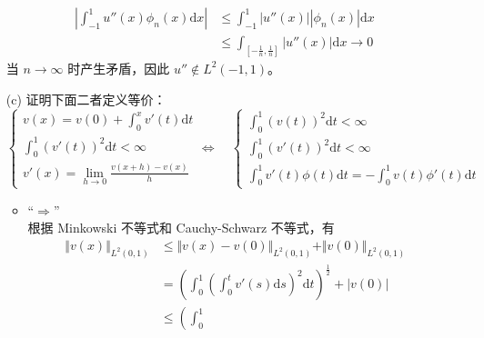 \documentclass[a4paper]{article}
\begin{document}
\begin{enumerate}
\begin{equation}
\begin{aligned}
                    \left|\int_{-1}^{1} u''(x) \phi_n(x) \text{d}x\right|
                    &\leq \int_{-1}^{1} |u''(x)||\phi_n(x)| \text{d}x\\
                    &\leq \int_{[-\frac{1}{n},\frac{1}{n}]} |u''(x)| \text{d}x
                    \to 0
                \end{aligned}
            \end{equation}
            当 $n \to \infty$ 时产生矛盾，因此 $u'' \notin L^2(-1,1)$。
    \item[(c)] 证明下面二者定义等价：
            \begin{equation}
                \begin{cases}
                    v(x) = v(0) + \displaystyle\int_{0}^{x} v'(t) \text{d}t\\
                    \displaystyle\int_{0}^{1} (v'(t))^2 \text{d}t < \infty\\
                    v'(x) = \displaystyle\lim_{h \to 0}\frac{v(x+h) - v(x)}{h}
                \end{cases}
                \Longleftrightarrow 
                \quad
                \begin{cases}
                    \displaystyle\int_{0}^{1} (v(t))^2 \text{d}t < \infty\\
                    \displaystyle\int_{0}^{1} (v'(t))^2 \text{d}t < \infty\\
                    \displaystyle\int_{0}^{1} v'(t) \phi(t) \text{d}t 
                    = -\displaystyle\int_{0}^{1} v(t) \phi'(t) \text{d}t
                \end{cases}
            \end{equation}
            \begin{itemize}
                \item “$\Rightarrow$”\\
                    根据 Minkowski 不等式和 Cauchy-Schwarz 不等式，有
                    \begin{equation}
                        \begin{aligned}
                            \Vert v(x) \Vert_{L^2(0,1)}
                            &\leq \Vert v(x) - v(0) \Vert_{L^2(0,1)} + \Vert v(0) \Vert_{L^2(0,1)}\\
                            &= \left(\int_{0}^{1}\left(\int_{0}^{t} v'(s) \text{d}s\right)^2\text{d}t\right)^{\frac{1}{2}}
                                + |v(0)|\\
                            &\leq \left(\int_{0}^{1}

\end{aligned}
\end{equation}
\end{itemize}
\end{enumerate}
\end{document}
